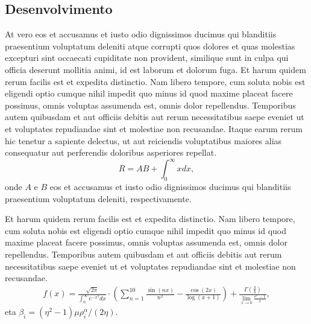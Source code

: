 \documentclass[a0,portrait]{a0poster}
\newcommand{\pa}[1]{\left({#1}\right)}
\begin{document}
\begin{mdframed}[style=MyFrame]
\begin{multicols}{2}
			
			
			
			
			\section{Desenvolvimento}\label{section2}
			At vero eos et accusamus et iusto odio dignissimos ducimus qui blanditiis praesentium voluptatum deleniti atque corrupti quos dolores et quas molestias excepturi sint occaecati cupiditate non provident, similique sunt in culpa qui officia deserunt mollitia animi, id est laborum et dolorum fuga. Et harum quidem rerum facilis est et expedita distinctio. Nam libero tempore, cum soluta nobis est eligendi optio cumque nihil impedit quo minus id quod maxime placeat facere possimus, omnis voluptas assumenda est, omnis dolor repellendus. Temporibus autem quibusdam et aut officiis debitis aut rerum necessitatibus saepe eveniet ut et voluptates repudiandae sint et molestiae non recusandae. Itaque earum rerum hic tenetur a sapiente delectus, ut aut reiciendis voluptatibus maiores alias consequatur aut perferendis doloribus asperiores repellat.
			\begin{equation}
				R = A B + \int_0^\infty x dx,
			\end{equation}
			onde $A$ e $B$ eos et accusamus et iusto odio dignissimos ducimus qui blanditiis praesentium voluptatum deleniti, respectivamente.
			
			Et harum quidem rerum facilis est et expedita distinctio. Nam libero tempore, cum soluta nobis est eligendi optio cumque nihil impedit quo minus id quod maxime placeat facere possimus, omnis voluptas assumenda est, omnis dolor repellendus. Temporibus autem quibusdam et aut officiis debitis aut rerum necessitatibus saepe eveniet ut et voluptates repudiandae sint et molestiae non recusandae.
			\begin{equation}\label{eqn:L}
				\begin{split}
					f(x) = \frac{\sqrt{2 \pi}}{\int_{0}^{\infty} e^{-x^2} dx} \cdot \left(\sum_{n=1}^{10} \frac{\sin(nx)}{n^2} - \frac{\cos(2x)}{\log(x+1)}\right) + \frac{\Gamma\left(\frac{3}{4}\right)}{\lim_{{x \to 0}} \frac{e^x - 1}{x}},
				\end{split}
			\end{equation}
			eta $\beta_i = {\pa{\eta^{2}-1}\mu\rho_{i}^{\alpha}}/{\left({2\eta}\right)}$.
			

\end{multicols}
\end{mdframed}
\end{document}
